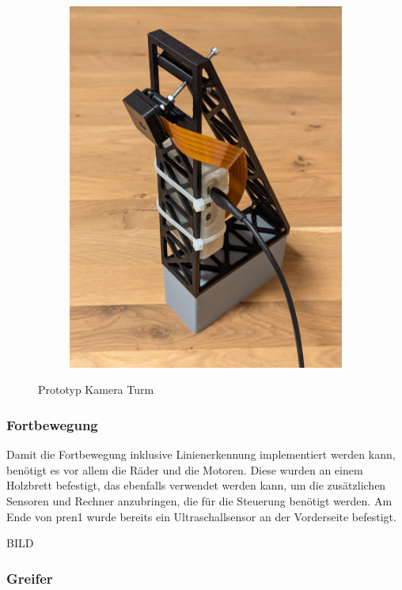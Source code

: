 \begin{figure}[H]
\begin{subfigure}{0.4\textwidth}
\includegraphics[width=0.95\linewidth]{assets/informatik-prototyp/camer_tower_2.png} 
\end{subfigure}
\caption{Prototyp Kamera Turm}
\label{fig:prototype-camera-tower}
\end{figure}

\subsubsection{Fortbewegung}

Damit die Fortbewegung inklusive Linienerkennung implementiert werden kann, benötigt es vor allem die Räder und die Motoren. Diese wurden an einem Holzbrett befestigt, das ebenfalls verwendet werden kann, um die zusätzlichen Sensoren und Rechner anzubringen, die für die Steuerung benötigt werden. Am Ende von \acrshort{pren1} wurde bereits ein Ultraschallsensor an der Vorderseite befestigt.

BILD

\subsubsection{Greifer}

